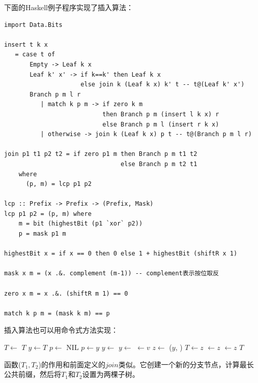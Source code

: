 \documentclass[b5paper]{ctexart}
\begin{document}
下面的Haskell例子程序实现了插入算法：

\begin{lstlisting}[style=Haskell]
import Data.Bits

insert t k x
   = case t of
       Empty -> Leaf k x
       Leaf k' x' -> if k==k' then Leaf k x
                     else join k (Leaf k x) k' t -- t@(Leaf k' x')
       Branch p m l r
          | match k p m -> if zero k m
                           then Branch p m (insert l k x) r
                           else Branch p m l (insert r k x)
          | otherwise -> join k (Leaf k x) p t -- t@(Branch p m l r)

join p1 t1 p2 t2 = if zero p1 m then Branch p m t1 t2
                                else Branch p m t2 t1
    where
      (p, m) = lcp p1 p2

lcp :: Prefix -> Prefix -> (Prefix, Mask)
lcp p1 p2 = (p, m) where
    m = bit (highestBit (p1 `xor` p2))
    p = mask p1 m

highestBit x = if x == 0 then 0 else 1 + highestBit (shiftR x 1)

mask x m = (x .&. complement (m-1)) -- complement表示按位取反

zero x m = x .&. (shiftR m 1) == 0

match k p m = (mask k m) == p
\end{lstlisting}

插入算法也可以用命令式方法实现：

\begin{algorithmic}[1]
    \State $T \gets$ 
    \State \Return $T$
  \EndIf
  \State $y \gets T$
  \State $p \gets$ NIL
    \State $p \gets y$
      \State $y \gets$ 
    \Else
      \State $y \gets$ 
    \EndIf
  \EndWhile
    \State {} $\gets v$
  \Else
    \State $z \gets$ ($y$, )
      \State $T \gets z$
    \Else
        \State {} $\gets z$
      \Else
        \State {} $\gets z$
      \EndIf
    \EndIf
  \EndIf
  \State \Return $T$
\EndFunction
\end{algorithmic}

函数($T_1, T_2$)的作用和前面定义的$join$类似。它创建一个新的分支节点，计算最长公共前缀，然后将$T_1$和$T_2$设置为两棵子树。
\end{document}
